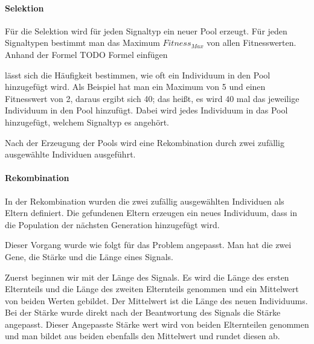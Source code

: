 \paragraph{Selektion}
F{\"u}r die Selektion wird f{\"u}r jeden Signaltyp ein neuer Pool erzeugt. 
F{\"u}r jeden Signaltypen bestimmt man das Maximum $Fitness_{Max}$ von allen Fitnesswerten.
Anhand der Formel 
TODO Formel einfügen


l{\"a}sst sich die H{\"a}ufigkeit bestimmen, wie oft ein Individuum in den Pool hinzugef{\"u}gt wird. Als Beispiel hat man ein Maximum von 5 und einen Fitnesswert von 2, daraus ergibt sich 40; das hei{\ss}t, es wird 40 mal das jeweilige Individuum in den Pool hinzuf{\"u}gt. Dabei wird jedes Individuum in das Pool hinzugef{\"u}gt, welchem Signaltyp es angeh{\"o}rt. 

Nach der Erzeugung der Pools wird eine Rekombination durch zwei zuf{\"a}llig ausgew{\"a}hlte Individuen ausgef{\"u}hrt.


\paragraph{Rekombination}
In der Rekombination wurden die zwei zuf{\"a}llig ausgew{\"a}hlten Individuen als Eltern definiert. Die gefundenen Eltern erzeugen ein neues Individuum, dass in die Population der n{\"a}chsten Generation hinzugef{\"u}gt wird. 

Dieser Vorgang wurde wie folgt f{\"u}r das Problem angepasst. Man hat die zwei Gene, die St{\"a}rke und die L{\"a}nge eines Signals.

Zuerst beginnen wir mit der L{\"a}nge des Signals. Es wird die L{\"a}nge des ersten Elternteils und die L{\"a}nge des zweiten Elternteils genommen und ein Mittelwert von beiden Werten gebildet. Der Mittelwert ist die L{\"a}nge des neuen Individuums.
Bei der St{\"a}rke wurde direkt nach der Beantwortung des Signals die St{\"a}rke angepasst. Dieser Angepasste St{\"a}rke wert wird von beiden Elternteilen genommen und man bildet aus beiden ebenfalls den Mittelwert und rundet diesen ab.

